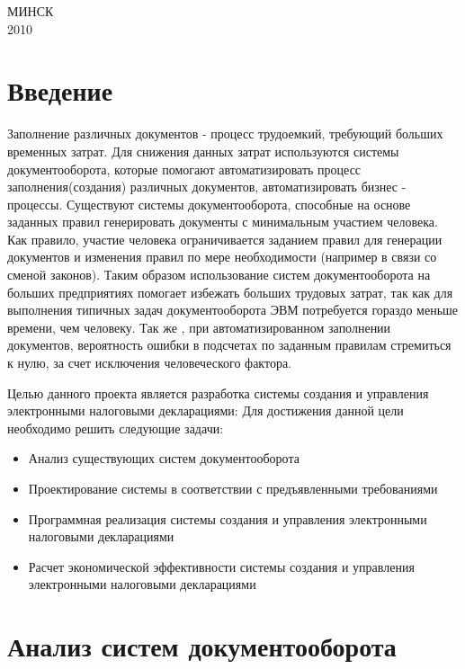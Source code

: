 \documentclass[14pt,a4paper]{reportmod}
\begin{document}
\begin{titlepage}
\vspace{1cm}

\begin{center}
МИНСК\\[10pt]
2010
\end{center}

\end{titlepage}

\linespread{1.05}
\setcounter{page}{4}
\thispagestyle{empty}
\tableofcontents

\chapter*{Введение}
Заполнение различных документов - процесс трудоемкий, требующий больших временных затрат. Для снижения данных затрат используются системы документооборота, которые помогают автоматизировать процесс заполнения(создания) различных документов, автоматизировать бизнес - процессы. Существуют системы документооборота, способные на основе заданных правил генерировать документы с минимальным участием человека. Как правило, участие человека ограничивается заданием правил для генерации документов и изменения правил по мере необходимости (например в связи со сменой законов). Таким образом использование систем документооборота на больших предприятиях помогает избежать больших трудовых затрат, так как для выполнения типичных задач документооборота ЭВМ потребуется гораздо меньше времени, чем человеку. Так же , при автоматизированном заполнении документов, вероятность ошибки в подсчетах по заданным правилам стремиться к нулю, за счет исключения человеческого фактора.


Целью данного проекта является разработка системы создания и управления электронными налоговыми декларациями: Для достижения данной цели необходимо решить следующие задачи:
\begin{itemize}
  \item Анализ существующих систем документооборота
  \item Проектирование системы в соответствии с предъявленными требованиями
  \item Программная реализация системы создания и управления электронными налоговыми декларациями
  \item Расчет экономической эффективности системы создания и управления электронными налоговыми декларациями
\end{itemize}

\chapter{Анализ систем документооборота}
\end{document}
